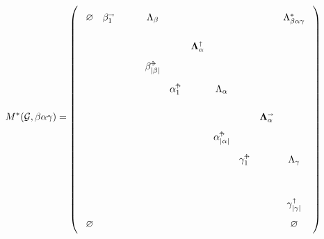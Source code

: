 \documentclass[sigplan,review,anonymous,acmsmall]{acmart}\settopmatter{printfolios=false,printccs=false,printacmref=false}
\begin{document}
\begin{equation*}
  M^*(\mathcal{G}, \beta\alpha\gamma)=
\begin{tikzpicture}[
  scale=0.4,
  baseline,
  label distance=10pt %
]

\matrix [matrix of math nodes,left delimiter=(,right delimiter=),row sep=0.1cm,column sep=0.1cm] (m) {
\varnothing & \beta_1^\shri & \phantom{\cdots} & \,\Lambda_{\beta}\,  &        &                      & \phantom{\qs{|\alpha|}} &        &                      & \smash{\Lambda_{\beta\alpha\gamma}^*}      \\
            &               & \phantom{\ddots} & \phantom{\vdots}     &        & \bm\Lambda_\alpha^\shup &                  &        &                      &        \\
            &               &                  & \bs{|\beta|}         &        &                      &                  &        &                      & \phantom{\bs{|\beta|}}       \\
            &               &                  &                      & \qs{1} & \phantom{\cdots}     & \Lambda_{\alpha} &        &                      & \phantom{\vs{j}} \\
            &               &                  &                      &        & \phantom{\ddots}     & \phantom{\vdots} &        & \bm\Lambda_\alpha^\shri &        \\
            &               &                  &                      &        &                      & \qs{|\alpha|}           &        &                      & \phantom{\qs{|\alpha|}}      \\
            &               &                  &                      &        &                      &                  & \gs{1} & \phantom{\cdots}     & \Lambda_{\gamma}\vphantom{\gs{1}} \\
            &               &                  &                      &        &                      &                  &        & \phantom{\ddots}     & \phantom{\vdots} \\
            &               &                  &                      &        &                      &                  &        &                      & \gamma_{|\gamma|}^\shup      \\
\varnothing &               &                  &                      &        &                      &                  &        &                      & \varnothing\\
};


\end{tikzpicture}
\end{equation*}
\end{document}
